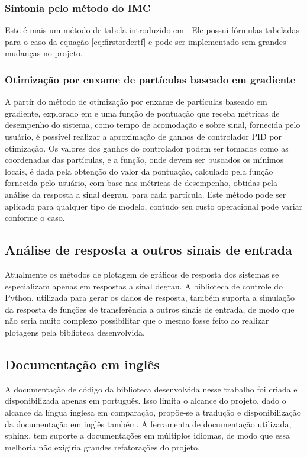 \subsubsection{Sintonia pelo método do IMC}
Este é mais um método de tabela introduzido em \cite{apostpidsint}.
Ele possui fórmulas tabeladas para o caso da equação \eqref{eq:firstordertf} e pode ser implementado sem grandes
mudanças no projeto.

\subsubsection{Otimização por enxame de partículas baseado em gradiente}
A partir do método de otimização por enxame de partículas baseado em gradiente, explorado em \cite{gpsopt} e uma função
de pontuação que receba métricas de desempenho do sistema, como tempo de acomodação e sobre sinal, fornecida pelo usuário,
é possível realizar a aproximação de ganhos de controlador PID por otimização.
Os valores dos ganhos do controlador podem ser tomados como as coordenadas das partículas, e a função, onde devem ser
buscados os mínimos locais, é dada pela obtenção do valor da pontuação, calculado pela função fornecida pelo
usuário, com base nas métricas de desempenho, obtidas pela análise da resposta a sinal degrau, para cada partícula.
Este método pode ser aplicado para qualquer tipo de modelo, contudo seu custo operacional pode variar conforme o caso.

\subsection{Análise de resposta a outros sinais de entrada}
Atualmente os métodos de plotagem de gráficos de resposta dos sistemas se especializam apenas em respostas a sinal
degrau.
A biblioteca de controle do Python, utilizada para gerar os dados de resposta, também suporta a simulação da resposta
de funções de transferência a outros sinais de entrada, de modo que não seria muito complexo possibilitar que o mesmo
fosse feito ao realizar plotagens pela biblioteca desenvolvida.

\subsection{Documentação em inglês}
A documentação de código da biblioteca desenvolvida nesse trabalho foi criada e disponibilizada apenas em português.
Isso limita o alcance do projeto, dado o alcance da língua inglesa em comparação, propõe-se a tradução e
disponibilização da documentação em inglês também.
A ferramenta de documentação utilizada, sphinx, tem suporte a documentações em múltiplos idiomas, de modo que essa
melhoria não exigiria grandes refatorações do projeto.

